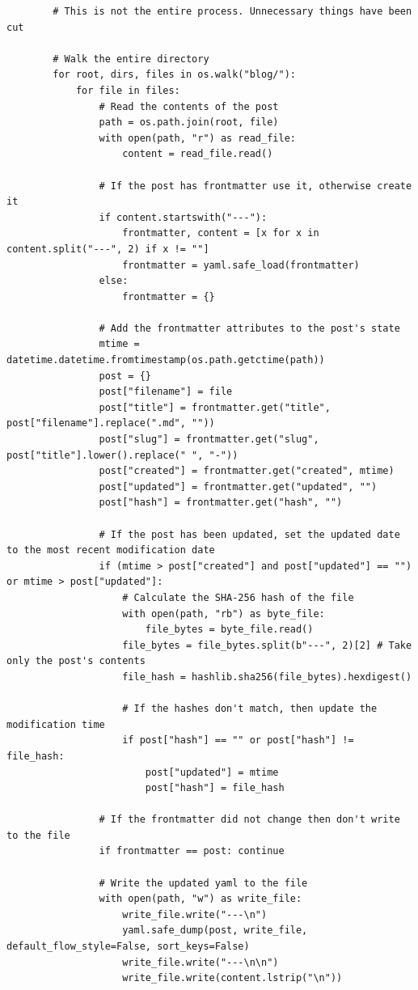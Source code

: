 \documentclass[titlepage]{article}
\begin{document}
        \begin{verbatim}
        # This is not the entire process. Unnecessary things have been cut

        # Walk the entire directory
        for root, dirs, files in os.walk("blog/"):
            for file in files:
                # Read the contents of the post
                path = os.path.join(root, file)
                with open(path, "r") as read_file:
                    content = read_file.read()

                # If the post has frontmatter use it, otherwise create it
                if content.startswith("---"):
                    frontmatter, content = [x for x in content.split("---", 2) if x != ""]
                    frontmatter = yaml.safe_load(frontmatter)
                else:
                    frontmatter = {}

                # Add the frontmatter attributes to the post's state
                mtime = datetime.datetime.fromtimestamp(os.path.getctime(path))
                post = {}
                post["filename"] = file
                post["title"] = frontmatter.get("title", post["filename"].replace(".md", ""))
                post["slug"] = frontmatter.get("slug", post["title"].lower().replace(" ", "-"))
                post["created"] = frontmatter.get("created", mtime)
                post["updated"] = frontmatter.get("updated", "")
                post["hash"] = frontmatter.get("hash", "")

                # If the post has been updated, set the updated date to the most recent modification date
                if (mtime > post["created"] and post["updated"] == "") or mtime > post["updated"]:
                    # Calculate the SHA-256 hash of the file
                    with open(path, "rb") as byte_file:
                        file_bytes = byte_file.read()
                    file_bytes = file_bytes.split(b"---", 2)[2] # Take only the post's contents
                    file_hash = hashlib.sha256(file_bytes).hexdigest()

                    # If the hashes don't match, then update the modification time
                    if post["hash"] == "" or post["hash"] != file_hash:
                        post["updated"] = mtime
                        post["hash"] = file_hash

                # If the frontmatter did not change then don't write to the file
                if frontmatter == post: continue

                # Write the updated yaml to the file
                with open(path, "w") as write_file:
                    write_file.write("---\n")
                    yaml.safe_dump(post, write_file, default_flow_style=False, sort_keys=False)
                    write_file.write("---\n\n")
                    write_file.write(content.lstrip("\n"))
        \end{verbatim}
\end{document}
